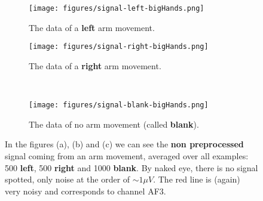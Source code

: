 \begin{figure}[p]
    \centering
    \begin{subfigure}{0.42\linewidth}
        \centering
        \captionsetup{width = 0.9\linewidth}
        \texttt{[image: figures/signal-left-bigHands.png]}
        \caption{The data of a \textbf{left} arm movement.}
        \label{fig:hand-large-left}
    \end{subfigure}%
    \begin{subfigure}{0.42\linewidth}
        \centering
        \captionsetup{width = 0.9\linewidth}
        \texttt{[image: figures/signal-right-bigHands.png]}
        \caption{The data of a \textbf{right} arm movement.}
        \label{fig:hand-large-right}
    \end{subfigure}%
    \\
    \begin{subfigure}{0.42\linewidth}
        \centering
        \captionsetup{width = 0.9\linewidth}
        \texttt{[image: figures/signal-blank-bigHands.png]}
        \caption{The data of no arm movement (called \textbf{blank}).}
        \label{fig:hand-large-blank}
    \end{subfigure}%
    \begin{minipage}{0.42 \linewidth}
        \caption{In the figures (a), (b) and (c) we can see the \textbf{non preprocessed} signal coming from an arm movement, averaged over all examples: 500 \textbf{left}, 500 \textbf{right} and 1000 \textbf{blank}. By naked eye, there is no signal spotted, only noise at the order of $\sim 1 \mu V$. The red line is (again) very noisy and corresponds to channel \textsc{AF3}.}
        \label{fig:hand-large}
    \end{minipage}
\end{figure}